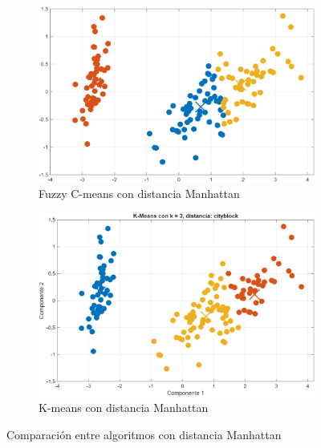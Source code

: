 \documentclass[11pt, letterpaper]{article}
\begin{document}
\begin{figure}[h!]
	\centering
	\begin{subfigure}[t]{0.48\textwidth}
		\centering
		\includegraphics[width=\linewidth]{IMG/R3.png}
		\caption{Fuzzy C-means con distancia Manhattan}
		\label{fig:r3}
	\end{subfigure}
	\hspace{0.02\textwidth}
	\begin{subfigure}[t]{0.48\textwidth}
		\centering
		\includegraphics[width=\linewidth]{IMG/R4.png}
		\caption{K-means con distancia Manhattan}
		\label{fig:r4}
	\end{subfigure}
	\caption{Comparación entre algoritmos con distancia Manhattan}
\end{figure}
\end{document}
